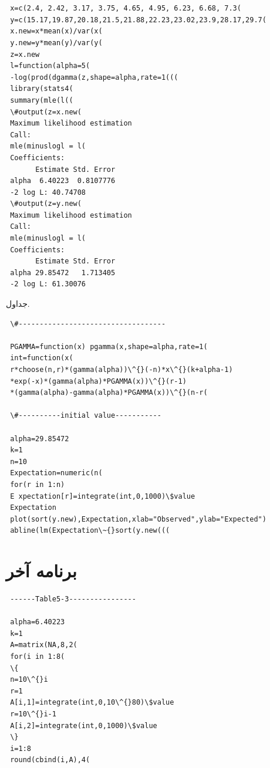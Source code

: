 \chapter{}
\begin{LTR}
\begin{verbatim}
 x=c(2.4, 2.42, 3.17, 3.75, 4.65, 4.95, 6.23, 6.68, 7.3(
 y=c(15.17,19.87,20.18,21.5,21.88,22.23,23.02,23.9,28.17,29.7(
 x.new=x*mean(x)/var(x(
 y.new=y*mean(y)/var(y(
 z=x.new
 l=function(alpha=5(
 -log(prod(dgamma(z,shape=alpha,rate=1(((
 library(stats4(
 summary(mle(l((
 \#output(z=x.new(
 Maximum likelihood estimation
 Call:
 mle(minuslogl = l(
 Coefficients:
       Estimate Std. Error
 alpha  6.40223  0.8107776
 -2 log L: 40.74708 
 \#output(z=y.new(
 Maximum likelihood estimation
 Call:
 mle(minuslogl = l(
 Coefficients:
       Estimate Std. Error
 alpha 29.85472   1.713405
 -2 log L: 61.30076 
\end{verbatim}
\end{LTR}
جداول.
\begin{LTR}
\begin{verbatim}
 \#-----------------------------------

 PGAMMA=function(x) pgamma(x,shape=alpha,rate=1(
 int=function(x(
 r*choose(n,r)*(gamma(alpha))\^{}(-n)*x\^{}(k+alpha-1)
 *exp(-x)*(gamma(alpha)*PGAMMA(x))\^{}(r-1)
 *(gamma(alpha)-gamma(alpha)*PGAMMA(x))\^{}(n-r(

 \#----------initial value-----------

 alpha=29.85472
 k=1
 n=10
 Expectation=numeric(n(
 for(r in 1:n)
 E xpectation[r]=integrate(int,0,1000)\$value
 Expectation
 plot(sort(y.new),Expectation,xlab="Observed",ylab="Expected")
 abline(lm(Expectation\~{}sort(y.new(((
\end{verbatim}
\end{LTR}
\chapter{برنامه‌ آخر}
\begin{LTR}
\begin{verbatim}
 ------Table5-3----------------

 alpha=6.40223
 k=1
 A=matrix(NA,8,2(
 for(i in 1:8(
 \{
 n=10\^{}i
 r=1
 A[i,1]=integrate(int,0,10\^{}80)\$value
 r=10\^{}i-1
 A[i,2]=integrate(int,0,1000)\$value
 \}
 i=1:8
 round(cbind(i,A),4(
\end{verbatim}
\end{LTR}

